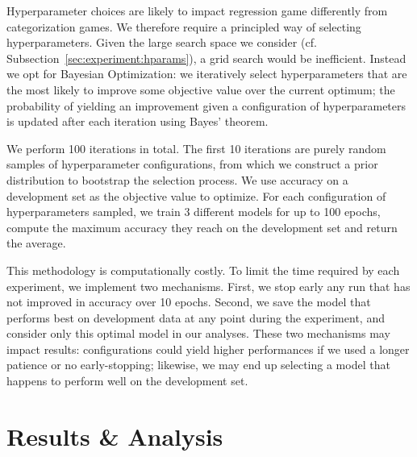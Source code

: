 \documentclass[twocolumn]{article}
\begin{document}
Hyperparameter choices are likely to impact regression game differently from categorization games. %
We therefore require a principled way of selecting hyperparameters. %
Given the large search space we consider (cf. Subsection~\ref{sec:experiment:hparams}), a grid search would be inefficient.
Instead we opt for Bayesian Optimization: we iteratively select hyperparameters that are the most likely to improve some objective value over the current optimum;
the probability of yielding an improvement given a configuration of hyperparameters is updated after each iteration using Bayes' theorem.

We perform 100 iterations in total.
The first 10 iterations are purely random samples of hyperparameter configurations, from which we construct a prior distribution to bootstrap the selection process. 
We use accuracy on a development set as the objective value to optimize.
For each configuration of hyperparameters sampled, we train 3 different models for up to 100 epochs, compute the maximum accuracy they reach on the development set and return the average.%

This methodology is computationally costly. %
To limit the time required by each experiment, we implement two mechanisms.
First, we stop early any run that has not improved in accuracy over 10 epochs.
Second, we save the model that performs best on development data at any point during the experiment, and consider only this optimal model in our analyses.
These two mechanisms may impact results: configurations could yield higher performances if we used a longer patience or no early-stopping; likewise, we may end up selecting a model that happens to perform well on the development set.

\section{Results \& Analysis} \label{sec:results}
\end{document}
